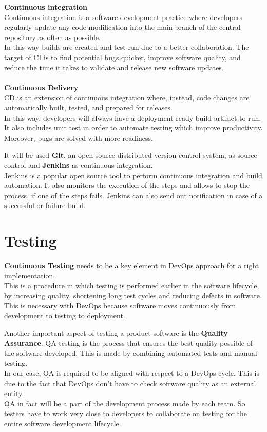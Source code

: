 \textbf{Continuous integration}\\
Continuous integration is a software development practice where developers regularly update any code modification into the main branch of the central repository as often as possible.\\ 
In this way builds are created and test run due to a better collaboration. The target of CI is to find potential bugs quicker, improve software quality, and reduce the time it takes to validate and release new software updates.\\
\medskip
\\
\textbf{Continuous Delivery}\\
CD is an extension of continuous integration where, instead, code changes are automatically built, tested, and prepared for releases.\\ 
In this way, developers will always have a deployment-ready build artifact to run. It also includes unit test in order to automate testing which improve productivity. Moreover, bugs are solved with more readiness.
\par

It will be used \textbf{Git}, an open source distributed version control system, as source control and \textbf{Jenkins} as continuous integration.\\
Jenkins is a popular open source tool to perform continuous integration and build automation.
It also monitors the execution of the steps and allows to stop the process, if one of the steps fails. Jenkins can also send out notification in case of a successful or failure build.

 
\section{Testing}

\textbf{Continuous Testing} needs to be a key element in DevOps approach for a right implementation. \\
This is a procedure in which testing is performed earlier in the software lifecycle, by increasing quality, shortening long test cycles and reducing defects in software.\\
This is necessary with DevOps because software moves continuously from development to testing to deployment.
\par
Another important aspect of testing a product software is the \textbf{Quality Assurance}.
QA testing is the process that ensures the best quality possible of the software developed. This is made by combining automated tests and manual testing.\\ 
In our case, QA is required to be aligned with respect to a DevOps cycle.
This is due to the fact that DevOps don't have to check software quality as an external entity.\\
QA in fact will be a part of the development process made by each team. 
So testers have to work very close to developers to collaborate on testing for the entire software development lifecycle.














